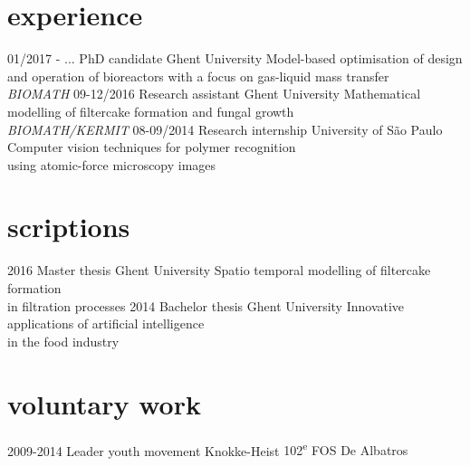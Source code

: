 \documentclass[]{friggeri-cv}
\begin{document}
\section{experience}
\begin{entrylist}
  \entry
    {01/2017 - ...}
    {PhD candidate}
    {Ghent University}
    {Model-based optimisation of design and operation of bioreactors with a focus on gas-liquid mass transfer \\ \textit{BIOMATH}}
    \entry
    {09-12/2016}
    {Research assistant}
    {Ghent University}
    {Mathematical modelling of filtercake formation and fungal growth \\{\textit{BIOMATH/KERMIT}}}
    \entry
    {08-09/2014}
    {Research internship}
    {University of S\~{a}o Paulo}
    {Computer vision techniques for polymer recognition\\ using atomic-force microscopy images}
\end{entrylist}

\section{scriptions}
\begin{entrylist}
  \entry
    {2016}
    {Master thesis}
    {Ghent University}
    {Spatio temporal modelling of filtercake formation\\ in filtration processes}
  \entry
    {2014}
    {Bachelor thesis}
    {Ghent University}
    {Innovative applications of artificial intelligence\\ in the food industry}
\end{entrylist}

\section{voluntary work}
\begin{entrylist}
 \entry
    {2009-2014}
    {Leader youth movement}
    {Knokke-Heist}
    {102\textsuperscript{e} FOS De Albatros}
\end{entrylist} 
   \clearpage
   
\end{document}
